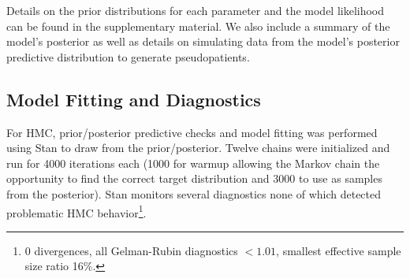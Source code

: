 %
%
%
%

Details on the prior distributions for each parameter and the model likelihood can be found in the supplementary material.  We also include a summary of the model's posterior as well as details on simulating data from the model's posterior predictive distribution to generate pseudopatients.

\subsection*{Model Fitting and Diagnostics}

For HMC, prior/posterior predictive checks and model fitting was performed using Stan \cite{Carpenter2017-qf} to draw from the prior/posterior.  Twelve chains were initialized and run for 4000 iterations each (1000 for warmup allowing the Markov chain the opportunity to find the correct target distribution and 3000 to use as samples from the posterior). Stan monitors several diagnostics none of which detected problematic HMC behavior\footnote{0 divergences, all Gelman-Rubin diagnostics $<1.01$, smallest effective sample size ratio 16\%.}.


